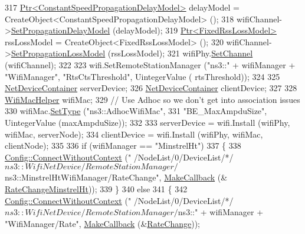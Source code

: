 \begin{DoxyCode}
317   \hyperlink{classns3_1_1Ptr}{Ptr<ConstantSpeedPropagationDelayModel>} delayModel = 
      CreateObject<ConstantSpeedPropagationDelayModel> ();
318   wifiChannel->\hyperlink{classns3_1_1YansWifiChannel_a51ebdd5a1d897dc46cf9783ac2879b98}{SetPropagationDelayModel} (delayModel);
319   \hyperlink{classns3_1_1Ptr}{Ptr<FixedRssLossModel>} rssLossModel = CreateObject<FixedRssLossModel> ();
320   wifiChannel->\hyperlink{classns3_1_1YansWifiChannel_ad2f92be1fb34be0075141cbb4f779191}{SetPropagationLossModel} (rssLossModel);
321   wifiPhy.\hyperlink{classns3_1_1YansWifiPhyHelper_ad2e9a27587dd4ff320435c93cc2676de}{SetChannel} (wifiChannel);
322 
323   wifi.SetRemoteStationManager (\textcolor{stringliteral}{"ns3::"} + wifiManager + \textcolor{stringliteral}{"WifiManager"}, \textcolor{stringliteral}{"RtsCtsThreshold"}, UintegerValue (
      rtsThreshold));
324 
325   \hyperlink{classns3_1_1NetDeviceContainer}{NetDeviceContainer} serverDevice;
326   \hyperlink{classns3_1_1NetDeviceContainer}{NetDeviceContainer} clientDevice;
327 
328   \hyperlink{classns3_1_1WifiMacHelper}{WifiMacHelper} wifiMac;
329   \textcolor{comment}{// Use Adhoc so we don't get into association issues}
330   wifiMac.\hyperlink{classns3_1_1WifiMacHelper_a382d8df76a1dd7007179d1963b4b6bc6}{SetType} (\textcolor{stringliteral}{"ns3::AdhocWifiMac"},
331                    \textcolor{stringliteral}{"BE\_MaxAmpduSize"}, UintegerValue (maxAmpduSize));
332 
333   serverDevice = wifi.Install (wifiPhy, wifiMac, serverNode);
334   clientDevice = wifi.Install (wifiPhy, wifiMac, clientNode);
335 
336   \textcolor{keywordflow}{if} (wifiManager == \textcolor{stringliteral}{"MinstrelHt"})
337     \{
338       \hyperlink{group__config_gaa2f896aa7021f95fffabc80b2ec22e08}{Config::ConnectWithoutContext} (\textcolor{stringliteral}{"
      /NodeList/0/DeviceList/*/$ns3::WifiNetDevice/RemoteStationManager/$ns3::MinstrelHtWifiManager/RateChange"}, \hyperlink{group__makecallbackmemptr_ga9376283685aa99d204048d6a4b7610a4}{MakeCallback} (&
      \hyperlink{wifi-manager-example_8cc_a59051cedbe984ebc1d26de63538eeef6}{RateChangeMinstrelHt}));
339     \}
340   \textcolor{keywordflow}{else}
341     \{
342       \hyperlink{group__config_gaa2f896aa7021f95fffabc80b2ec22e08}{Config::ConnectWithoutContext} (\textcolor{stringliteral}{"
      /NodeList/0/DeviceList/*/$ns3::WifiNetDevice/RemoteStationManager/$ns3::"} + wifiManager + \textcolor{stringliteral}{"WifiManager/Rate"}, 
      \hyperlink{group__makecallbackmemptr_ga9376283685aa99d204048d6a4b7610a4}{MakeCallback} (&\hyperlink{wifi-manager-example_8cc_a480632f18145ef95c5adaac058fc88ce}{RateChange}));

\end{DoxyCode}

